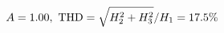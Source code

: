 \documentclass[preview]{standalone}
\begin{document}
\begin{align*}
\special{dvisvgm:raw <g id='unique000'>}A=1.00,\ \text{THD}=\sqrt{H_2^2+H_3^2}/H_1=17.5\%\special{dvisvgm:raw </g>}
\end{align*}
\end{document}
